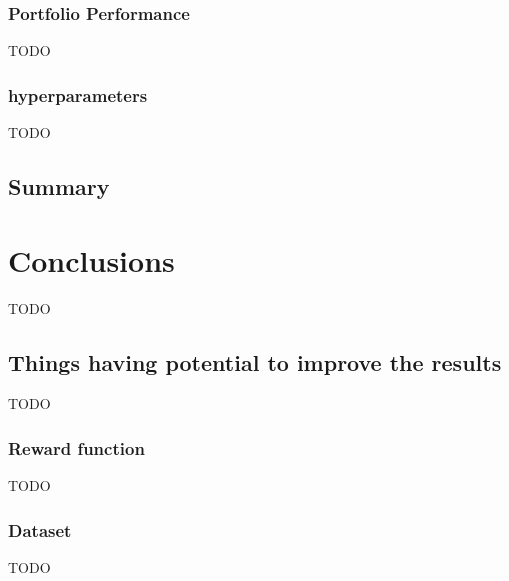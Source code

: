 \subsection{Portfolio Performance}\label{sec:portfolio-performance}
TODO

\subsection{hyperparameters}\label{sec:hyperparameters}
TODO


\section{Summary}\label{sec:summary}




\chapter{Conclusions}\label{sec:conclusions}
TODO


\section{Things having potential to improve the results}\label{sec:things-having-potential-to-improve-the-results}
TODO

\subsection{Reward function}\label{sec:reward-function}
TODO

\subsection{Dataset}\label{sec:dataset-future-work}
TODO
